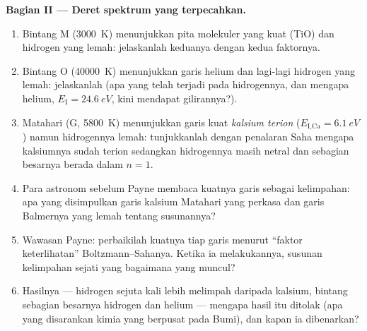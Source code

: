 \begin{problem}
\medskip\noindent\textbf{Bagian II --- Deret spektrum yang
terpecahkan.}
\begin{enumerate}[resume]
  \item Bintang M (\qty{3000}{K}) menunjukkan pita molekuler yang kuat
        (TiO) dan hidrogen yang lemah: jelaskanlah keduanya dengan kedua
        faktornya.
  \item Bintang O (\qty{40000}{K}) menunjukkan garis helium dan lagi-lagi
        hidrogen yang lemah: jelaskanlah (apa yang telah terjadi pada
        hidrogennya, dan mengapa helium, $E_{\text{I}} = \qty{24.6}{eV}$,
        kini mendapat gilirannya?).
  \item Matahari (G, \qty{5800}{K}) menunjukkan garis kuat
        \emph{kalsium terion} ($E_{\text{I,Ca}} = \qty{6.1}{eV}$)
        namun hidrogennya lemah: tunjukkanlah dengan penalaran Saha
        mengapa kalsiumnya sudah terion sedangkan hidrogennya masih
        netral dan sebagian besarnya berada dalam $n = 1$.
  \item Para astronom sebelum Payne membaca kuatnya garis sebagai
        kelimpahan: apa yang disimpulkan garis kalsium Matahari yang
        perkasa dan garis Balmernya yang lemah tentang susunannya?
  \item Wawasan Payne: perbaikilah kuatnya tiap garis menurut ``faktor
        keterlihatan'' Boltzmann--Sahanya. Ketika ia melakukannya,
        susunan kelimpahan sejati yang bagaimana yang muncul?
  \item Hasilnya --- hidrogen sejuta kali lebih melimpah daripada
        kalsium, bintang sebagian besarnya hidrogen dan helium ---
        mengapa hasil itu ditolak (apa yang disarankan kimia yang
        berpusat pada Bumi), dan kapan ia dibenarkan?
\end{enumerate}


\end{problem}
